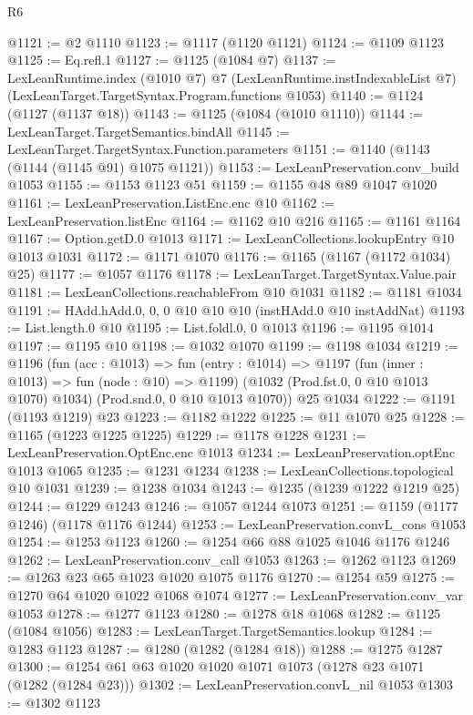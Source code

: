 \begin{lexlean}{R6}
\begin{coremodule}
{{{{{{{{{{{{{{{{{{{{@1121 := @2 @1110
@1123 := @1117 (@1120 @1121)
@1124 := @1109 @1123
@1125 := Eq.refl.{1}
@1127 := @1125 (@1084 @7)
@1137 := LexLeanRuntime.index
    (@1010 @7)
    @7
    (LexLeanRuntime.instIndexableList @7)
    (LexLeanTarget.TargetSyntax.Program.functions @1053)
@1140 := @1124 (@1127 (@1137 @18))
@1143 := @1125 (@1084 (@1010 @1110))
@1144 := LexLeanTarget.TargetSemantics.bindAll
@1145 := LexLeanTarget.TargetSyntax.Function.parameters
@1151 := @1140 (@1143 (@1144 (@1145 @91) @1075 @1121))
@1153 := LexLeanPreservation.conv_build @1053
@1155 := @1153 @1123 @51
@1159 := @1155 @48 @89 @1047 @1020
@1161 := LexLeanPreservation.ListEnc.enc @10
@1162 := LexLeanPreservation.listEnc
@1164 := @1162 @10 @216
@1165 := @1161 @1164
@1167 := Option.getD.{0} @1013
@1171 := LexLeanCollections.lookupEntry @10 @1013 @1031
@1172 := @1171 @1070
@1176 := @1165 (@1167 (@1172 @1034) @25)
@1177 := @1057 @1176
@1178 := LexLeanTarget.TargetSyntax.Value.pair
@1181 := LexLeanCollections.reachableFrom @10 @1031
@1182 := @1181 @1034
@1191 := HAdd.hAdd.{0, 0, 0} @10 @10 @10 (instHAdd.{0} @10 instAddNat)
@1193 := List.length.{0} @10
@1195 := List.foldl.{0, 0} @1013
@1196 := @1195 @1014
@1197 := @1195 @10
@1198 := @1032 @1070
@1199 := @1198 @1034
@1219 := @1196
    (fun (acc : @1013) =>
    fun (entry : @1014) =>
    @1197
      (fun (inner : @1013) => fun (node : @10) => @1199)
      (@1032 (Prod.fst.{0, 0} @10 @1013 @1070) @1034)
      (Prod.snd.{0, 0} @10 @1013 @1070))
    @25
    @1034
@1222 := @1191 (@1193 @1219) @23
@1223 := @1182 @1222
@1225 := @11 @1070 @25
@1228 := @1165 (@1223 @1225 @1225)
@1229 := @1178 @1228
@1231 := LexLeanPreservation.OptEnc.enc @1013
@1234 := LexLeanPreservation.optEnc @1013 @1065
@1235 := @1231 @1234
@1238 := LexLeanCollections.topological @10 @1031
@1239 := @1238 @1034
@1243 := @1235 (@1239 @1222 @1219 @25)
@1244 := @1229 @1243
@1246 := @1057 @1244 @1073
@1251 := @1159 (@1177 @1246) (@1178 @1176 @1244)
@1253 := LexLeanPreservation.convL_cons @1053
@1254 := @1253 @1123
@1260 := @1254 @66 @88 @1025 @1046 @1176 @1246
@1262 := LexLeanPreservation.conv_call @1053
@1263 := @1262 @1123
@1269 := @1263 @23 @65 @1023 @1020 @1075 @1176
@1270 := @1254 @59
@1275 := @1270 @64 @1020 @1022 @1068 @1074
@1277 := LexLeanPreservation.conv_var @1053
@1278 := @1277 @1123
@1280 := @1278 @18 @1068
@1282 := @1125 (@1084 @1056)
@1283 := LexLeanTarget.TargetSemantics.lookup
@1284 := @1283 @1123
@1287 := @1280 (@1282 (@1284 @18))
@1288 := @1275 @1287
@1300 := @1254 @61 @63 @1020 @1020 @1071 @1073 (@1278 @23 @1071 (@1282 (@1284 @23)))
@1302 := LexLeanPreservation.convL_nil @1053
@1303 := @1302 @1123
}}}}}}}}}}}}}}}}}}}}
\end{coremodule}
\end{lexlean}
